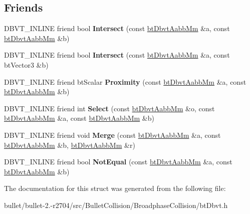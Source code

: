 \subsection*{Friends}
\begin{DoxyCompactItemize}
\item 
\hypertarget{structbt_dbvt_aabb_mm_a58901e7699bdc88aa0a4e7d6e1200156}{D\+B\+V\+T\+\_\+\+I\+N\+L\+I\+N\+E friend bool {\bfseries Intersect} (const \hyperlink{structbt_dbvt_aabb_mm}{bt\+Dbvt\+Aabb\+Mm} \&a, const \hyperlink{structbt_dbvt_aabb_mm}{bt\+Dbvt\+Aabb\+Mm} \&b)}\label{structbt_dbvt_aabb_mm_a58901e7699bdc88aa0a4e7d6e1200156}

\item 
\hypertarget{structbt_dbvt_aabb_mm_a908648b3fc05f022df71dc8809257253}{D\+B\+V\+T\+\_\+\+I\+N\+L\+I\+N\+E friend bool {\bfseries Intersect} (const \hyperlink{structbt_dbvt_aabb_mm}{bt\+Dbvt\+Aabb\+Mm} \&a, const bt\+Vector3 \&b)}\label{structbt_dbvt_aabb_mm_a908648b3fc05f022df71dc8809257253}

\item 
\hypertarget{structbt_dbvt_aabb_mm_ab07b0b13aaf7c4f84e4c5a603611602c}{D\+B\+V\+T\+\_\+\+I\+N\+L\+I\+N\+E friend bt\+Scalar {\bfseries Proximity} (const \hyperlink{structbt_dbvt_aabb_mm}{bt\+Dbvt\+Aabb\+Mm} \&a, const \hyperlink{structbt_dbvt_aabb_mm}{bt\+Dbvt\+Aabb\+Mm} \&b)}\label{structbt_dbvt_aabb_mm_ab07b0b13aaf7c4f84e4c5a603611602c}

\item 
\hypertarget{structbt_dbvt_aabb_mm_a57d49ba44a56803bbd93cf591fa72ec9}{D\+B\+V\+T\+\_\+\+I\+N\+L\+I\+N\+E friend int {\bfseries Select} (const \hyperlink{structbt_dbvt_aabb_mm}{bt\+Dbvt\+Aabb\+Mm} \&o, const \hyperlink{structbt_dbvt_aabb_mm}{bt\+Dbvt\+Aabb\+Mm} \&a, const \hyperlink{structbt_dbvt_aabb_mm}{bt\+Dbvt\+Aabb\+Mm} \&b)}\label{structbt_dbvt_aabb_mm_a57d49ba44a56803bbd93cf591fa72ec9}

\item 
\hypertarget{structbt_dbvt_aabb_mm_a6b632dafd4f19b6b91b766476c3ae43f}{D\+B\+V\+T\+\_\+\+I\+N\+L\+I\+N\+E friend void {\bfseries Merge} (const \hyperlink{structbt_dbvt_aabb_mm}{bt\+Dbvt\+Aabb\+Mm} \&a, const \hyperlink{structbt_dbvt_aabb_mm}{bt\+Dbvt\+Aabb\+Mm} \&b, \hyperlink{structbt_dbvt_aabb_mm}{bt\+Dbvt\+Aabb\+Mm} \&r)}\label{structbt_dbvt_aabb_mm_a6b632dafd4f19b6b91b766476c3ae43f}

\item 
\hypertarget{structbt_dbvt_aabb_mm_a50a983887ecf866dda3b078b5164a331}{D\+B\+V\+T\+\_\+\+I\+N\+L\+I\+N\+E friend bool {\bfseries Not\+Equal} (const \hyperlink{structbt_dbvt_aabb_mm}{bt\+Dbvt\+Aabb\+Mm} \&a, const \hyperlink{structbt_dbvt_aabb_mm}{bt\+Dbvt\+Aabb\+Mm} \&b)}\label{structbt_dbvt_aabb_mm_a50a983887ecf866dda3b078b5164a331}

\end{DoxyCompactItemize}


The documentation for this struct was generated from the following file\+:\begin{DoxyCompactItemize}
\item 
bullet/bullet-\/2.-\/r2704/src/\+Bullet\+Collision/\+Broadphase\+Collision/bt\+Dbvt.\+h\end{DoxyCompactItemize}
